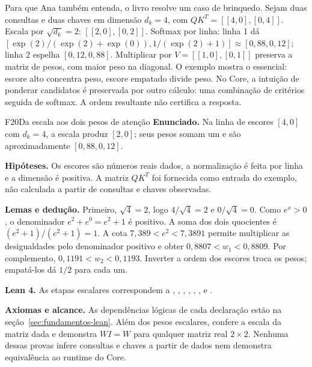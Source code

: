 Para que Ana tamb\'em entenda, o livro resolve um caso de brinquedo. Sejam duas consultas e duas chaves em dimens\~ao $d_{k}=4$, com $QK^{T} = [[4,0],[0,4]]$. Escala por $\sqrt{d_{k}}=2$: $[[2,0],[0,2]]$. Softmax por linha: linha 1 d\'a $[\exp(2)/(\exp(2)+\exp(0)), 1/(\exp(2)+1)] \approx [0{,}88, 0{,}12]$; linha 2 espelha $[0{,}12, 0{,}88]$. Multiplicar por $V=[[1,0],[0,1]]$ preserva a matriz de pesos, com maior peso na diagonal. O exemplo mostra o essencial: escore alto concentra peso, escore empatado divide peso. No Core, a intuição de ponderar candidatos é preservada por outro cálculo: uma combinação de critérios seguida de softmax. A ordem resultante não certifica a resposta.

\begin{formalizacao}{F20}{Da escala aos dois pesos de atenção}
\textbf{Enunciado.} Na linha de escores $[4,0]$ com $d_k=4$, a escala produz $[2,0]$; seus pesos somam um e são aproximadamente $[0{,}88,0{,}12]$.

\textbf{Hipóteses.} Os escores são números reais dados, a normalização é feita por linha e a dimensão é positiva. A matriz $QK^T$ foi fornecida como entrada do exemplo, não calculada a partir de consultas e chaves observadas.

\textbf{Lemas e dedução.} Primeiro, $\sqrt4=2$, logo $4/\sqrt4=2$ e $0/\sqrt4=0$. Como $e^x>0$, o denominador $e^2+e^0=e^2+1$ é positivo. A soma dos dois quocientes é $(e^2+1)/(e^2+1)=1$. A cota $7{,}389<e^2<7{,}3891$ permite multiplicar as desigualdades pelo denominador positivo e obter $0{,}8807<w_1<0{,}8809$. Por complemento, $0{,}1191<w_2<0{,}1193$. Inverter a ordem dos escores troca os pesos; empatá-los dá $1/2$ para cada um.

\textbf{Lean 4.} As etapas escalares correspondem a , , , , , ,  e .

\textbf{Axiomas e alcance.} As dependências lógicas de cada declaração estão na seção~\ref{sec:fundamentos-lean}. Além dos pesos escalares,  confere a escala da matriz dada e  demonstra $WI=W$ para qualquer matriz real $2\times2$. Nenhuma dessas provas infere consultas e chaves a partir de dados nem demonstra equivalência ao runtime do Core.
\end{formalizacao}

